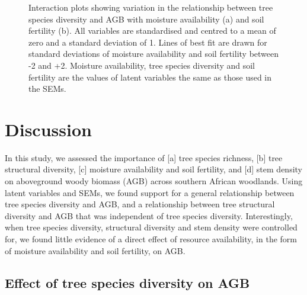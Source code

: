 \documentclass[11pt,a4paper]{article}
\begin{document}
\begin{figure}[H]
\centering
	\caption{Interaction plots showing variation in the relationship between tree species diversity and AGB with moisture availability (a) and soil fertility (b). All variables are standardised and centred to a mean of zero and a standard deviation of 1. Lines of best fit are drawn for standard deviations of moisture availability and soil fertility between -2 and +2. Moisture availability, tree species diversity and soil fertility are the values of latent variables the same as those used in the SEMs.}
	\label{int_plots}
\end{figure}

\section{Discussion}


In this study, we assessed the importance of [a] tree species richness, [b] tree structural diversity, [c] moisture availability and soil fertility, and [d] stem density on aboveground woody biomass (AGB) across southern African woodlands. Using latent variables and SEMs, we found support for a general relationship between tree species diversity and AGB, and a relationship between tree structural diversity and AGB that was independent of tree species diversity. Interestingly, when tree species diversity, structural diversity and stem density were controlled for, we found little evidence of a direct effect of resource availability, in the form of moisture availability and soil fertility, on AGB.

\subsection{Effect of tree species diversity on AGB}
\end{document}
